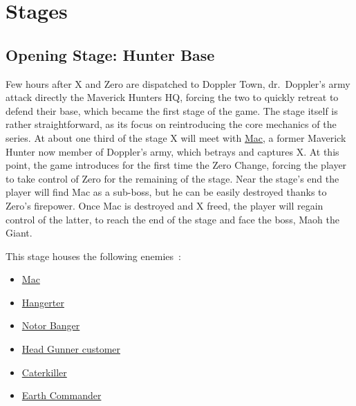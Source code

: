 \chapter{Stages}
\section{Opening Stage: Hunter Base}\label{X3:intro_stage}
Few hours after X and Zero are dispatched to Doppler Town, dr.~Doppler's army attack directly the Maverick Hunters HQ, forcing the two to quickly retreat to defend their base, which became the first stage of the game. The stage itself is rather straightforward, as its focus on reintroducing the core mechanics of the series. At about one third of the stage X will meet with \hyperlink{miniboss:Mac}{Mac}, a former Maverick Hunter now member of Doppler's army, which betrays and captures X. At this point, the game introduces for the first time the Zero Change, forcing the player to take control of Zero for the remaining of the stage. Near the stage's end the player will find Mac as a sub-boss, but he can be easily destroyed thanks to Zero's firepower. Once Mac is destroyed  and X freed, the player will regain control of the latter, to reach the end of the stage and face the boss, Maoh the Giant.

This stage houses  the following enemies~\cite{wiki:X3_opening}:
\begin{itemize}
	\item \hyperlink{miniboss:Mac}{Mac}
	\item \hyperlink{enem:Hangerter}{Hangerter}
	\item \hyperlink{enem:Notor_Banger}{Notor Banger}
	\item \hyperlink{enem:Head_Gunner_customer}{Head Gunner customer}
	\item \hyperlink{enem:Caterkiller}{Caterkiller}
	\item \hyperlink{enem:Earth_Commander}{Earth Commander}
\end{itemize}

